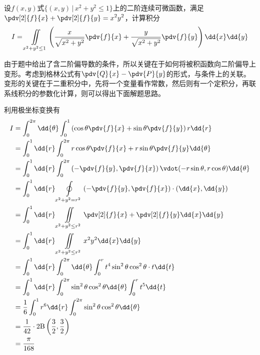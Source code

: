 \begin{example}
    设$f(x,y)$式$\{ (x,y)\,|\, x^2+y^2\leq 1 \}$上的二阶连续可微函数，满足$\displaystyle\pdv[2]{f}{x}+\pdv[2]{f}{y}=x^2y^2$，计算积分
    \[ I = \iint\limits_{x^2+y^2\leq 1} \left(\frac{x}{\sqrt{x^2+y^2}}\pdv{f}{x} + \frac{y}{\sqrt{x^2+y^2}}\pdv{f}{y}\right)\dd{x}\dd{y} \]
\end{example}
\begin{solution}
    由于题中给出了含二阶偏导数的条件，所以关键在于如何将被积函数向二阶偏导上变形。考虑到格林公式有$\displaystyle\pdv{Q}{x}-\pdv{P}{y}$的形式，与条件上的关联。
    变形的关键在于二重积分中，先将一个变量看作常数，然后则有一个定积分，再联系线积分的参数化计算，则可以得出下面解题思路。

    利用极坐标变换有
    \begin{align*}
        I & = \int_0^{2\pi}\dd{\theta}\int_0^1 \left(\cos\theta \pdv{f}{x} + \sin\theta\pdv{f}{y}\right)r\dd{r}            \\
          & = \int_0^1 \dd{r}\int_0^{2\pi} r\cos\theta \pdv{f}{x} + r\sin\theta\pdv{f}{y}\dd{\theta}                       \\
          & = \int_0^1 \dd{r} \int_0^{2\pi} \left(-\pdv{f}{y},\pdv{f}{x}\right)\vdot(-r\sin\theta, r\cos\theta)\dd{\theta} \\
          & = \int_0^1 \dd{r} \oint\limits_{x^2+y^2 = r^2} \left(-\pdv{f}{y},\pdv{f}{x}\right)\cdot(\dd{x},\dd{y})         \\
          & = \int_0^1 \dd{r} \iint\limits_{x^2+y^2\leq r^2} \pdv[2]{f}{x} + \pdv[2]{f}{y} \dd{x}\dd{y}                    \\
          & = \int_0^1 \dd{r} \iint\limits_{x^2+y^2\leq r^2} x^2y^2 \dd{x}\dd{y}                                           \\
          & = \int_0^1 \dd{r} \int_0^{2\pi} \dd{\theta}\int_0^r t^4\sin^2\theta\cos^2\theta \cdot t \dd{t}                 \\
          & = \int_0^1 \dd{r} \int_0^{2\pi} \sin^2\theta\cos^2\theta \dd{\theta}\int_0^r t^5 \dd{t}                        \\
          & = \frac{1}{6}\int_0^1 r^6 \dd{r} \int_0^{2\pi} \sin^2\theta\cos^2\theta\dd{\theta}                             \\
          & = \frac{1}{42}\cdot 2\mathrm{B}\left(\frac{3}{2},\frac{3}{2}\right)                                            \\
          & = \frac{\pi}{168}
    \end{align*}
\end{solution}

